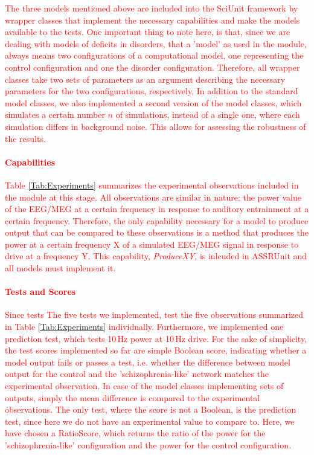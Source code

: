 \documentclass[a4paper,10pt]{article}
\begin{document}
\textcolor{red}{The three models mentioned above are included into the SciUnit framework by wrapper classes that implement the necessary capabilities and make the models available to the tests.
One important thing to note here, is that, since we are dealing with models of deficits in disorders, that a 'model' as used in the module, always means two configurations of a computational 
model, one representing the control configuration and one the disorder configuration. Therefore, all wrapper classes take two sets of parameters as an argument describing the necessary parameters
for the two configurations, respectively.
In addition to the standard model classes, we also implemented a second version of the model classes, which simulates a certain number $n$ of simulations, instead of a single one, 
where each simulation differs in background noise. This allows for assessing the robustness of the results.
}

\paragraph{\textcolor{red}{Capabilities}}
\textcolor{red}{Table \ref{Tab:Experiments} summarizes the experimental observations included in the module at this stage. All observations are similar in nature: the power value of the EEG/MEG 
at a certain frequency in response to auditory entrainment at a certain frequency. Therefore, the only capability necessary for a model to produce output that can be compared to these observations
is a method that produces the power at a certain frequency X of a simulated EEG/MEG signal in response to drive at a frequency Y. This capability, \textit{ProduceXY}, is inlcuded in ASSRUnit and all models
must implement it.}

\paragraph{\textcolor{red}{Tests and Scores}}
\textcolor{red}{
Since tests  The five tests we implemented, test the five observations summarized in Table \ref{Tab:Experiments} individually. Furthermore, we implemented one 
prediction test, which tests 10\,Hz power at 10\,Hz drive.
For the sake of simplicity, the test scores implemented so far are simple Boolean score, indicating whether a model output fails or passes a test, i.e. whether the difference 
between model output for the control and the 'schizophrenia-like' network
matches the experimental observation. In case of the model classes implementing sets of outputs, simply the mean difference is compared to the experimental observations.
The only test, where the score is not a Boolean, is the prediction test, since here we do not have an experimental value to compare to. Here, we have chosen a RatioScore, which
returns the ratio of the power for the 'schizophrenia-like'  configuration and the power for the control configuration.
}
\end{document}
